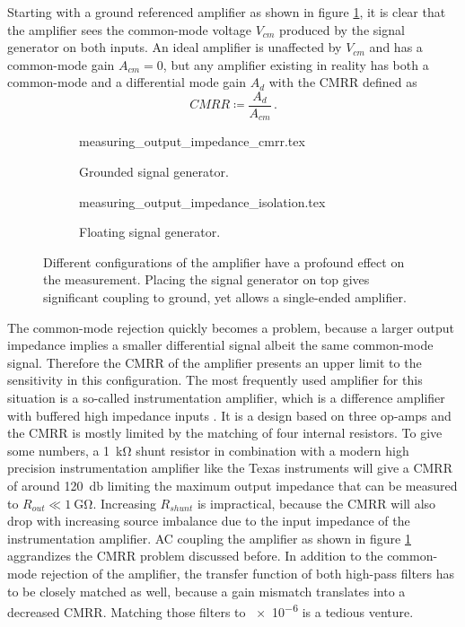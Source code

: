 Starting with a ground referenced amplifier as shown in figure \ref{fig:measuring_output_impedance_cmrr}, it is clear that the amplifier sees the common-mode voltage $V_{cm}$ produced by the signal generator on both inputs. An ideal amplifier is unaffected by $V_{cm}$ and has a common-mode gain $A_{cm} = 0$, but any amplifier existing in reality has both a common-mode and a differential mode gain $A_d$ with the CMRR defined as \citep[p. 328]{tietze_2015}
\begin{equation*}
    CMRR \coloneqq \frac{A_d}{A_{cm}}\,.
\end{equation*}
\begin{figure}[ht]
    \centering
    \begin{subfigure}{0.4\linewidth}
        \centering
        {measuring_output_impedance_cmrr.tex}
        \caption{Grounded signal generator.}
        \label{fig:measuring_output_impedance_cmrr}
    \end{subfigure}
    \begin{subfigure}{0.5\linewidth}
        \centering
        {measuring_output_impedance_isolation.tex}
        \caption{Floating signal generator.}
        \label{fig:measuring_output_impedance_isolation}
    \end{subfigure}
    \caption{Different configurations of the amplifier have a profound effect on the measurement. Placing the signal generator on top gives significant coupling to ground, yet allows a single-ended amplifier.}
    \label{fig:measuring_output_impedance_challenges}
\end{figure}

The common-mode rejection quickly becomes a problem, because a larger output impedance implies a smaller differential signal albeit the same common-mode signal. Therefore the CMRR of the amplifier presents an upper limit to the sensitivity in this configuration. The most frequently used amplifier for this situation is a so-called instrumentation amplifier, which is a difference amplifier with buffered high impedance inputs \cite{tietze_2015}. It is a design based on three op-amps and the CMRR is mostly limited by the matching of four internal resistors. To give some numbers, a \qty{1}{\kilo\ohm} shunt resistor in combination with a modern high precision instrumentation amplifier like the Texas instruments  \cite{datasheet_INA821} will give a CMRR of around \qty{120}{\decibel} limiting the maximum output impedance that can be measured to $R_{out} \ll \qty{1}{\giga \ohm}$. Increasing $R_{shunt}$ is impractical, because the CMRR will also drop with increasing source imbalance due to the input impedance of the instrumentation amplifier. AC coupling the amplifier as shown in figure \ref{fig:measuring_output_impedance_cmrr} aggrandizes the CMRR problem discussed before. In addition to the common-mode rejection of the amplifier, the transfer function of both high-pass filters has to be closely matched as well, because a gain mismatch translates into a decreased CMRR. Matching those filters to \num{e-6} is a tedious venture.

